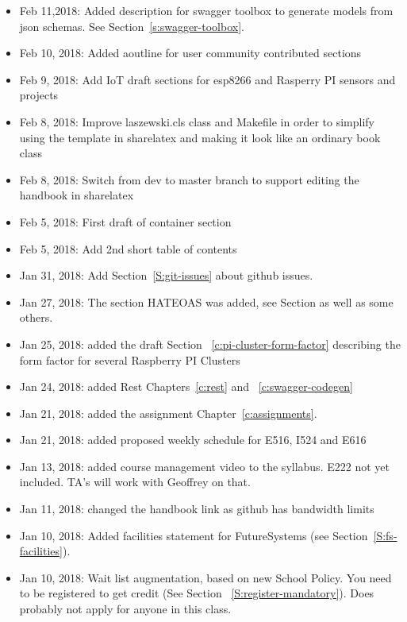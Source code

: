 \begin{itemize}
\item Feb 11,2018: Added description for swagger toolbox to generate
  models from json schemas. See Section~\ref{s:swagger-toolbox}.
\item Feb 10, 2018: Added aoutline for user community contributed
  sections
\item Feb 9, 2018: Add IoT draft sections for esp8266 and Rasperry PI
  sensors and projects
\item Feb 8, 2018: Improve laszewski.cls class and Makefile in order
  to simplify using the template in sharelatex and making it look like
  an ordinary book class
\item Feb 8, 2018: Switch from dev to master branch to support editing
  the handbook in sharelatex
\item Feb 5, 2018: First draft of container section
\item Feb 5, 2018: Add 2nd short table of contents
\item Jan 31, 2018: Add Section~\ref{S:git-issues} about github issues.
\item Jan 27, 2018: The section HATEOAS was added, see
  Section \label{s:hateoas} as well as some others.
\item Jan 25, 2018: added the draft Section
 ~\ref{c:pi-cluster-form-factor} describing the form factor for
  several Raspberry PI Clusters

\item Jan 24, 2018: added Rest Chapters~\ref{c:rest} and
 ~\ref{c:swagger-codegen}
 
\item Jan 21, 2018: added the assignment Chapter~\ref{c:assignments}.

\item Jan 21, 2018: added proposed weekly schedule for E516, I524 and
  E616

\item Jan 13, 2018: added course management video to the
  syllabus. E222 not yet included. TA's will work with Geoffrey on
  that.

\item Jan 11, 2018: changed the handbook link as github has bandwidth
  limits

\item Jan 10, 2018: Added facilities statement for FutureSystems (see
  Section~\ref{S:fs-facilities}).

\item Jan 10, 2018: Wait list augmentation, based on new School
  Policy. You need to be registered to get credit (See Section
 ~\ref{S:register-mandatory}). Does probably not apply for anyone in
  this class.

\end{itemize}
